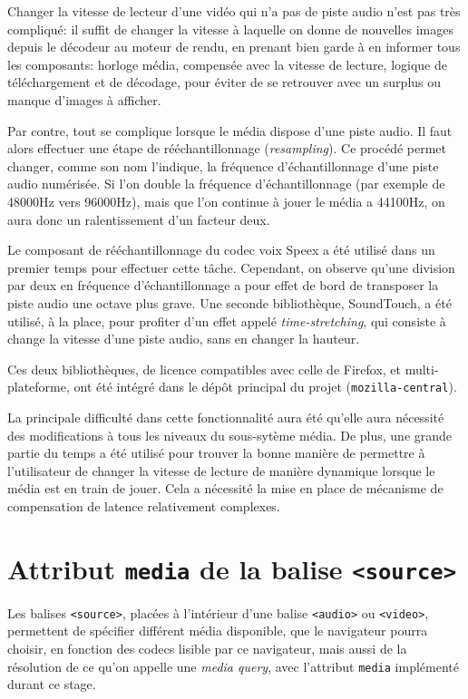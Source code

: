 \documentclass[a4paper,10pt]{article}
\newcommand{\cc}[1]{\texttt{#1}}
\begin{document}
\begin{multicols}{2}
  Changer la vitesse de lecteur d'une vidéo qui n'a pas de piste audio n'est pas
  très compliqué: il suffit de changer la vitesse à laquelle on donne de
  nouvelles images depuis le décodeur au moteur de rendu, en prenant bien garde
  à en informer tous les composants: horloge média, compensée avec la vitesse de
  lecture, logique de téléchargement et de décodage, pour éviter de se retrouver
  avec un surplus ou manque d'images à afficher.

  Par contre, tout se complique lorsque le média dispose d'une piste audio. Il
  faut alors effectuer une étape de rééchantillonnage (\emph{resampling}). Ce
  procédé permet changer, comme son nom l'indique, la fréquence
  d'échantillonnage d'une piste audio numérisée. Si l'on double la fréquence
  d'échantillonnage (par exemple de 48000Hz vers 96000Hz), mais que l'on continue
  à jouer le média a 44100Hz, on aura donc un ralentissement d'un facteur deux.

  Le composant de rééchantillonnage du codec voix Speex a été utilisé dans un
  premier temps pour effectuer cette tâche. Cependant, on observe qu'une
  division par deux en fréquence d'échantillonnage a pour effet de bord de
  transposer la piste audio une octave plus grave. Une seconde bibliothèque,
  SoundTouch, a été utilisé, à la place, pour profiter d'un effet appelé
  \emph{time-stretching}, qui consiste à change la vitesse d'une piste audio,
  sans en changer la hauteur.

  Ces deux bibliothèques, de licence compatibles avec celle de Firefox, et
  multi-plateforme, ont été intégré dans le dépôt principal du projet
  (\cc{mozilla-central}).

  La principale difficulté dans cette fonctionnalité aura été qu'elle aura
  nécessité des modifications à tous les niveaux du sous-sytème média. De plus,
  une grande partie du temps a été utilisé pour trouver la bonne manière de
  permettre à l'utilisateur de changer la vitesse de lecture de manière
  dynamique lorsque le média est en train de jouer. Cela a nécessité la mise en
  place de mécanisme de compensation de latence relativement complexes.

  \section{Attribut \cc{media} de la balise \cc{<source>}}

  Les balises \cc{<source>}, placées à l'intérieur d'une balise \cc{<audio>} ou
  \cc{<video>}, permettent de spécifier différent média disponible, que le
  navigateur pourra choisir, en fonction des codecs lisible par ce navigateur,
  mais aussi de la résolution de ce qu'on appelle une \emph{media query}, avec
  l'attribut \cc{media} implémenté durant ce stage.


\end{multicols}
\end{document}
